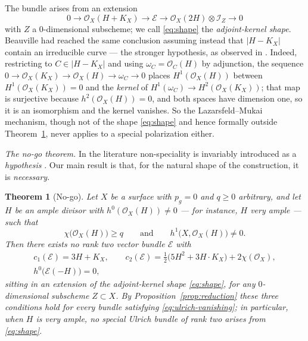 \documentclass{amsart}
\newtheorem{theorem}{Theorem}[section]
\theoremstyle{definition}
\newcommand{\OO}{\mathcal{O}}
\newcommand{\EE}{\mathcal{E}}
\newcommand{\II}{\mathcal{I}}
\begin{document}
The bundle arises from an extension
\begin{equation}\label{eq:shape}
0\longrightarrow\OO_X(H+K_X)\longrightarrow\EE\longrightarrow\OO_X(2H)\otimes\II_Z\longrightarrow 0
\end{equation}
with $Z$ a $0$-dimensional subscheme; we call \eqref{eq:shape} the \emph{adjoint-kernel shape}. Beauville \cite{Bea16b} had reached the same conclusion assuming instead that $|H-K_X|$ contain an irreducible curve --- the stronger hypothesis, as observed in \cite[Rem.~3.5]{Cas17}. Indeed, restricting to $C\in|H-K_X|$ and using $\omega_C=\OO_C(H)$ by adjunction, the sequence $0\to\OO_X(K_X)\to\OO_X(H)\to\omega_C\to0$ places $H^1(\OO_X(H))$ between $H^1(\OO_X(K_X))=0$ and the \emph{kernel} of $H^1(\omega_C)\to H^2(\OO_X(K_X))$; that map is surjective because $h^2(\OO_X(H))=0$, and both spaces have dimension one, so it is an isomorphism and the kernel vanishes. So the Lazarsfeld--Mukai mechanism, though not of the shape \eqref{eq:shape} and hence formally outside Theorem~\ref{thm:nogo}, never applies to a special polarization either.

\smallskip
\noindent\emph{The no-go theorem.} In the literature non-speciality is invariably introduced as a \emph{hypothesis} \cite{Bea16b,Cas17,Cas22,Cas19}. Our main result is that, for the natural shape of the construction, it is \emph{necessary}.

\begin{theorem}[No-go]\label{thm:nogo}
Let $X$ be a surface with $p_g=0$ and $q\ge0$ arbitrary, and let $H$ be an ample divisor with $h^0(\OO_X(H))\neq0$ --- for instance, $H$ very ample --- such that
\[
\chi\bigl(\OO_X(H)\bigr)\ge q\qquad\text{and}\qquad h^1\bigl(X,\OO_X(H)\bigr)\neq0 .
\]
Then there exists \emph{no} rank two vector bundle $\EE$ with
\begin{gather*}
c_1(\EE)=3H+K_X,\qquad c_2(\EE)=\tfrac12\bigl(5H^2+3H\cdot K_X\bigr)+2\chi(\OO_X),\\
h^0\bigl(\EE(-H)\bigr)=0,
\end{gather*}
sitting in an extension of the adjoint-kernel shape \eqref{eq:shape}, for any $0$-dimensional subscheme $Z\subset X$. By Proposition~\ref{prop:reduction} these three conditions hold for every bundle satisfying \eqref{eq:ulrich-vanishing}; in particular, when $H$ is very ample, no special Ulrich bundle of rank two arises from \eqref{eq:shape}.
\end{theorem}
\end{document}
